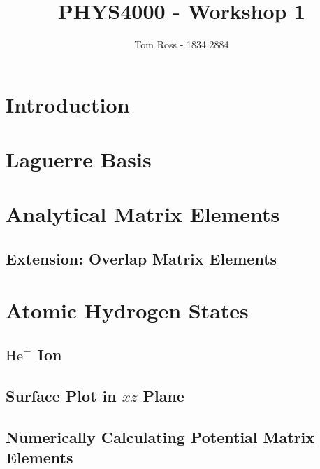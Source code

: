 \documentclass[draft]{article}
\title{PHYS4000 - Workshop 1}
\author{Tom Ross - 1834 2884}
\date{}
\begin{document}
\section{Introduction}
\label{sec:introduction}

\section{Laguerre Basis}
\label{sec:laguerre-basis}



\section{Analytical Matrix Elements}
\label{sec:analyt-matr-elem}

\subsection{Extension: Overlap Matrix Elements}
\label{sec:extens-overl-matr}

\section{Atomic Hydrogen States}
\label{sec:atom-hydr-stat}

\subsection{$\mathrm{He}^{+}$ Ion}
\label{sec:he+-ion}

\subsection{Surface Plot in $xz$ Plane}
\label{sec:surface-plot-xz}

\subsection{Numerically Calculating Potential Matrix Elements}
\label{sec:numer-calc-potent}
\end{document}
